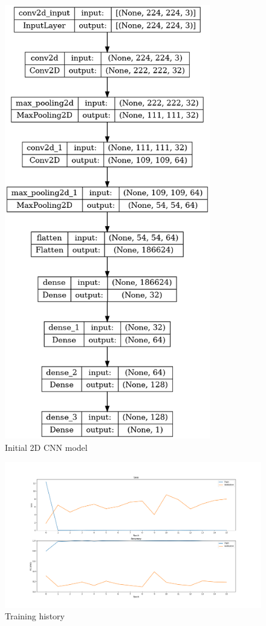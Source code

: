 \begin{figure}[H]
    \centering
    \includegraphics[width=0.8\textwidth, height=1.3\textwidth]{images/2D_3_noDrop.png}
    \caption{Initial 2D CNN model}
    \label{fig:First2DCNN}
\end{figure}

\begin{figure}[H]
    \centering
    \includegraphics[width=1\textwidth]{images/731a-2D3-86ad-history.png}
    \caption{Training history}
    \label{fig:First2DCNNHistory}
\end{figure}


